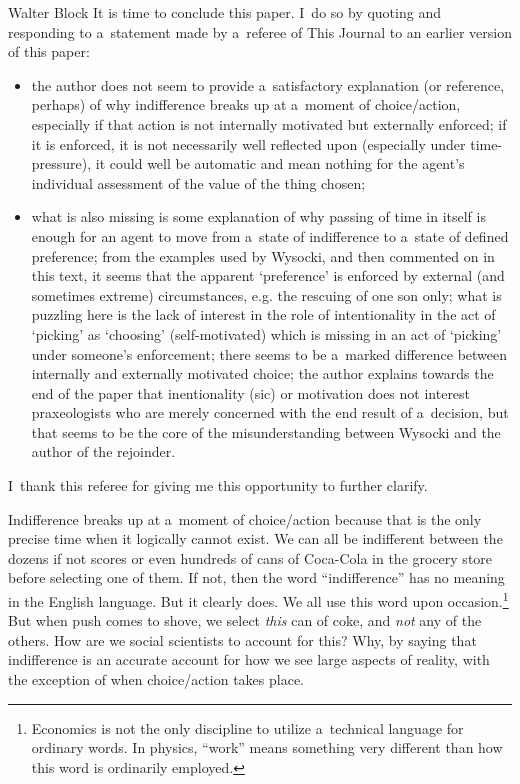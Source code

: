 \begin{artengenv}{Walter Block}
It is time to conclude this paper. I~do so by quoting and responding to a~statement made by a~referee of This Journal to an earlier version of this paper:
\begin{small}
\begin{itemize}
\item the author does not seem to provide a~satisfactory explanation (or reference, perhaps) of why indifference breaks up at a~moment of choice/action, especially if that action is not internally motivated but externally enforced; if it is enforced, it is not necessarily well reflected upon (especially under time-pressure), it could well be automatic and mean nothing for the agent's individual assessment of the value of the thing chosen;
\item what is also missing is some explanation of why passing of time in itself is enough for an agent to move from a~state of indifference to a~state of defined preference; from the examples used by Wysocki, and then commented on in this text, it seems that the apparent ‘preference' is enforced by external (and sometimes extreme) circumstances, e.g. the rescuing of one son only; what is puzzling here is the lack of interest in the role of intentionality in the act of ‘picking' as ‘choosing' (self-motivated) which is missing in an act of ‘picking' under someone's enforcement; there seems to be a~marked difference between internally and externally motivated choice; the author explains towards the end of the paper that inentionality (sic) or motivation does not interest praxeologists who are merely concerned with the end result of a~decision, but that seems to be the core of the misunderstanding between Wysocki and the author of the rejoinder.
\end{itemize}
\end{small}
I~thank this referee for giving me this opportunity to further clarify.

Indifference breaks up at a~moment of choice/action because that is the only precise time when it logically cannot exist. We can all be indifferent between the dozens if not scores or even hundreds of cans of Coca-Cola in the grocery store before selecting one of them. If not, then the word ``indifference'' has no meaning in the English language. But it clearly does. We all use this word upon occasion.\footnote{Economics is not the only discipline to utilize a~technical language for ordinary words. In physics, ``work'' means something very different than how this word is ordinarily employed.} But when push comes to shove, we select \textit{this} can of coke, and \textit{not} any of the others. How are we social scientists to account for this? Why, by saying that indifference is an accurate account for how we see large aspects of reality, with the exception of when choice/action takes place.


\end{artengenv}
